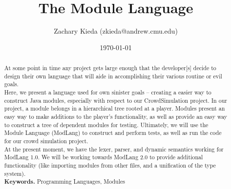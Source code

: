 \documentclass[11pt]{article}
\begin{document}
\title{The Module Language}
\author{Zachary Kieda (zkieda@andrew.cmu.edu)}
\date{\today}
\maketitle
\begin{abstract}
\setlength\parindent{0pt}\noindent 

At some point in time any project gets large enough that the developer[s] decide to design their own language that will aide in accomplishing their various routine or evil goals.\\

Here, we present a language used for own sinister goals -- creating a easier way to construct Java modules, especially with respect to our CrowdSimulation project. In our project, a module belongs in a hierarchical tree rooted at a player. Modules present an easy way to make additions to the player's functionality, as well as provide an easy way to construct a tree of dependent modules for testing. Ultimately, we will use the Module Language (ModLang) to construct and perform tests, as well as run the code for our crowd simulation project.\\

At the present moment, we have the lexer, parser, and dynamic semantics working for ModLang 1.0. We will be working towards ModLang 2.0 to provide additional functionality (like importing modules from other files, and a unification of the type system). \\

\textbf{Keywords.} Programming Languages, Modules
\end{abstract}
\pagebreak
\end{document}
